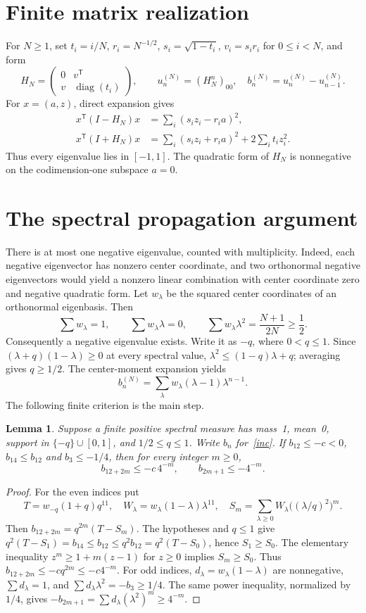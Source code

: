 \documentclass[11pt]{article}
\newtheorem{lemma}[theorem]{Lemma}
\begin{document}
\section{Finite matrix realization}
For $N\ge1$, set $t_i=i/N$, $r_i=N^{-1/2}$, $s_i=\sqrt{1-t_i}$,
$v_i=s_ir_i$ for $0\le i<N$, and form
\[
 H_N=\begin{pmatrix}0&v^{\mathsf T}\\v&\operatorname{diag}(t_i)\end{pmatrix},
 \qquad u_n^{(N)}=(H_N^n)_{00},\quad b_n^{(N)}=u_n^{(N)}-u_{n-1}^{(N)}.
\]
For $x=(a,z)$, direct expansion gives
\begin{align*}
 x^{\mathsf T}(I-H_N)x&=\sum_i(s_iz_i-r_ia)^2,\\
 x^{\mathsf T}(I+H_N)x&=\sum_i(s_iz_i+r_ia)^2+2\sum_it_iz_i^2.
\end{align*}
Thus every eigenvalue lies in $[-1,1]$. The quadratic form of $H_N$
is nonnegative on the codimension-one subspace $a=0$.

\newpage
\section{The spectral propagation argument}
There is at most one negative eigenvalue, counted with multiplicity.
Indeed, each negative eigenvector has nonzero center coordinate, and two
orthonormal negative eigenvectors would yield a nonzero linear combination
with center coordinate zero and negative quadratic form. Let $w_\lambda$
be the squared center coordinates of an orthonormal eigenbasis. Then
\[
 \sum w_\lambda=1,\qquad \sum w_\lambda\lambda=0,\qquad
 \sum w_\lambda\lambda^2=\frac{N+1}{2N}\ge\frac12.
\]
Consequently a negative eigenvalue exists. Write it as $-q$, where $0<q\le1$.
Since $(\lambda+q)(1-\lambda)\ge0$ at every spectral value,
$\lambda^2\le(1-q)\lambda+q$; averaging gives $q\ge1/2$.
The center-moment expansion yields
\begin{equation}\label{inc}
 b_n^{(N)}=\sum_\lambda w_\lambda(\lambda-1)\lambda^{n-1}.
\end{equation}
The following finite criterion is the main step.
\begin{lemma}\label{prop}
Suppose a finite positive spectral measure has mass~1, mean~0, support in
$\{-q\}\cup[0,1]$, and $1/2\le q\le1$. Write $b_n$ for~\eqref{inc}.
If $b_{12}\le-c<0$, $b_{14}\le b_{12}$ and $b_3\le-1/4$, then for every
integer $m\ge0$,
\[
 b_{12+2m}\le-c\,4^{-m},\qquad b_{2m+1}\le-4^{-m}.
\]
\end{lemma}
\begin{proof}
For the even indices put
\[
 T=w_{-q}(1+q)q^{11},\quad
 W_\lambda=w_\lambda(1-\lambda)\lambda^{11},\quad
 S_m=\sum_{\lambda\ge0}W_\lambda\bigl((\lambda/q)^2\bigr)^m.
\]
Then $b_{12+2m}=q^{2m}(T-S_m)$. The hypotheses and $q\le1$ give
$q^2(T-S_1)=b_{14}\le b_{12}\le q^2b_{12}=q^2(T-S_0)$,
hence $S_1\ge S_0$. The elementary inequality
$z^m\ge1+m(z-1)$ for $z\ge0$ implies $S_m\ge S_0$.
Thus $b_{12+2m}\le-cq^{2m}\le-c4^{-m}$.
For odd indices, $d_\lambda=w_\lambda(1-\lambda)$ are nonnegative,
$\sum d_\lambda=1$, and $\sum d_\lambda\lambda^2=-b_3\ge1/4$.
The same power inequality, normalized by $1/4$, gives
$-b_{2m+1}=\sum d_\lambda(\lambda^2)^m\ge4^{-m}$.
\end{proof}
\end{document}
